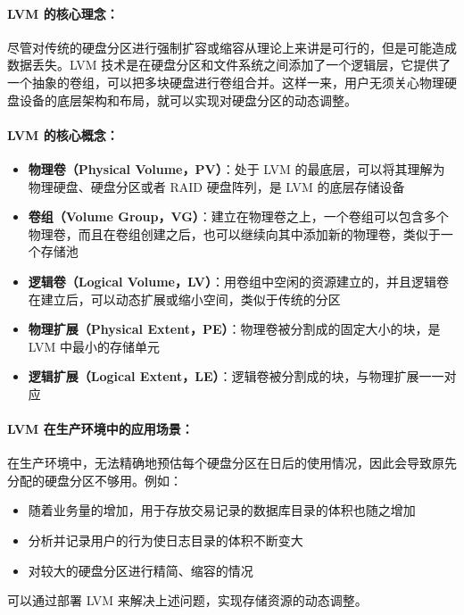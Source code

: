 \documentclass[12pt,UTF8]{ctexbook}
\begin{document}
\paragraph{LVM 的核心理念：}
尽管对传统的硬盘分区进行强制扩容或缩容从理论上来讲是可行的，但是可能造成数据丢失。LVM 技术是在硬盘分区和文件系统之间添加了一个逻辑层，它提供了一个抽象的卷组，可以把多块硬盘进行卷组合并。这样一来，用户无须关心物理硬盘设备的底层架构和布局，就可以实现对硬盘分区的动态调整。

\paragraph{LVM 的核心概念：}
\begin{itemize}
    \item \textbf{物理卷（Physical Volume，PV）}：处于 LVM 的最底层，可以将其理解为物理硬盘、硬盘分区或者 RAID 硬盘阵列，是 LVM 的底层存储设备
    \item \textbf{卷组（Volume Group，VG）}：建立在物理卷之上，一个卷组可以包含多个物理卷，而且在卷组创建之后，也可以继续向其中添加新的物理卷，类似于一个存储池
    \item \textbf{逻辑卷（Logical Volume，LV）}：用卷组中空闲的资源建立的，并且逻辑卷在建立后，可以动态扩展或缩小空间，类似于传统的分区
    \item \textbf{物理扩展（Physical Extent，PE）}：物理卷被分割成的固定大小的块，是 LVM 中最小的存储单元
    \item \textbf{逻辑扩展（Logical Extent，LE）}：逻辑卷被分割成的块，与物理扩展一一对应
\end{itemize}

\paragraph{LVM 在生产环境中的应用场景：}
在生产环境中，无法精确地预估每个硬盘分区在日后的使用情况，因此会导致原先分配的硬盘分区不够用。例如：
\begin{itemize}
    \item 随着业务量的增加，用于存放交易记录的数据库目录的体积也随之增加
    \item 分析并记录用户的行为使日志目录的体积不断变大
    \item 对较大的硬盘分区进行精简、缩容的情况
\end{itemize}

可以通过部署 LVM 来解决上述问题，实现存储资源的动态调整。
\end{document}
